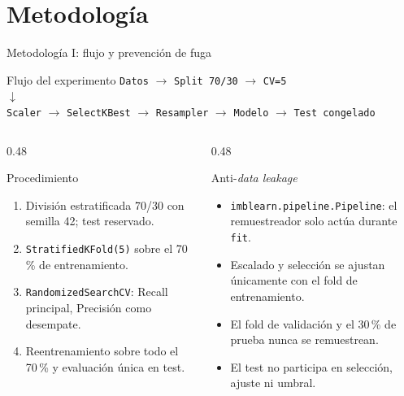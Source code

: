\documentclass[aspectratio=169,11pt]{beamer}
\begin{document}
\section{Metodología}

\begin{frame}{Metodología I: flujo y prevención de fuga}
  \begin{block}{Flujo del experimento}
    \small
    \centering
    \texttt{Datos} $\to$ \texttt{Split 70/30} $\to$ \texttt{CV=5}\\
    $\downarrow$\\
    \texttt{Scaler} $\to$ \texttt{SelectKBest} $\to$ \texttt{Resampler}
    $\to$ \texttt{Modelo} $\to$ \texttt{Test congelado}
  \end{block}

  \begin{columns}[T]
    \begin{column}{0.48\textwidth}
      \begin{block}{Procedimiento}
        \scriptsize
        \begin{enumerate}
          \item División estratificada 70/30 con semilla 42; test reservado.
          \item \texttt{StratifiedKFold(5)} sobre el 70\,\% de entrenamiento.
          \item \texttt{RandomizedSearchCV}: Recall principal, Precisión
                como desempate.
          \item Reentrenamiento sobre todo el 70\,\% y evaluación única en test.
        \end{enumerate}
      \end{block}
    \end{column}
    \begin{column}{0.48\textwidth}
      \begin{block}{Anti-\textit{data leakage}}
        \scriptsize
        \begin{itemize}
          \item \texttt{imblearn.pipeline.Pipeline}: el remuestreador solo
                actúa durante \texttt{fit}.
          \item Escalado y selección se ajustan únicamente con el fold de
                entrenamiento.
          \item El fold de validación y el 30\,\% de prueba nunca se
                remuestrean.
          \item El test no participa en selección, ajuste ni umbral.
        \end{itemize}
      \end{block}
    \end{column}
  \end{columns}


\end{frame}
\end{document}
